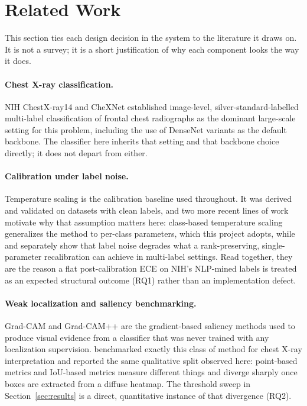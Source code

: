 \section{Related Work}

This section ties each design decision in the system to the literature it draws on. It
is not a survey; it is a short justification of why each component looks the way it
does.

\paragraph{Chest X-ray classification.} NIH ChestX-ray14 \citep{wang2017chestxray8} and
CheXNet \citep{rajpurkar2017chexnet} established image-level, silver-standard-labelled
multi-label classification of frontal chest radiographs as the dominant large-scale
setting for this problem, including the use of DenseNet variants as the default
backbone. The classifier here inherits that setting and that backbone choice directly;
it does not depart from either.

\paragraph{Calibration under label noise.} Temperature scaling \citep{guo2017calibration}
is the calibration baseline used throughout. It was derived and validated on datasets
with clean labels, and two more recent lines of work motivate why that assumption
matters here: class-based temperature scaling \citep{frenkel2021classbased} generalizes
the method to per-class parameters, which this project adopts, while
\citet{wu2026transts} and \citet{li2022noisetransition} separately show that label noise
degrades what a rank-preserving, single-parameter recalibration can achieve in
multi-label settings. Read together, they are the reason a flat post-calibration ECE on
NIH's NLP-mined labels is treated as an expected structural outcome (RQ1) rather than an
implementation defect.

\paragraph{Weak localization and saliency benchmarking.} Grad-CAM
\citep{selvaraju2017gradcam} and Grad-CAM++ \citep{chattopadhay2018gradcampp} are the
gradient-based saliency methods used to produce visual evidence from a classifier that
was never trained with any localization supervision.
\citet{saporta2022benchmarking} benchmarked exactly this class of method for chest X-ray
interpretation and reported the same qualitative split observed here: point-based
metrics and IoU-based metrics measure different things and diverge sharply once boxes
are extracted from a diffuse heatmap. The threshold sweep in Section~\ref{sec:results}
is a direct, quantitative instance of that divergence (RQ2).

